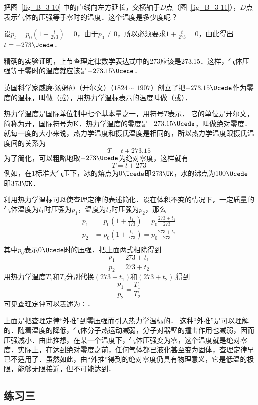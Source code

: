 把图~\ref{fig_B_3-10} 中的直线向左方延长，交横轴于$D$点（图~\ref{fig_B_3-11}），$D$点表示气体的压强等于零时的温度．这个温度是多少度呢？

设$p_t=p_0 \left(1+\frac{t}{273}\right)=0$，由于$p_0\ne 0$，所以必须要求$1+\frac{t}{273}=0$，由此得出$t=-273 \Ucede $．

精确的实验证明，上节查理定律数学表达式中的273应该是273.15．这样，气体压强等于零时的温度就应该是$-273.15 \Ucede $．



英国科学家威廉$\cdot$汤姆孙（开尔文）（$1824 \sim 1907$）创立了把$-273.15 \Ucede$作为零度的温标，叫做（或），用热力学温标表示的温度叫做（或）．

热力学温度是国际单位制中七个基本量之一，用符号$T$表示．
它的单位是开尔文，简称为开，国际符号为K．热力学温度的零度是$-273.15 \Ucede$，叫做绝对零度．就每一度的大小来说，热力学温度和摄氏温度是相同的，所以热力学温度跟摄氏温度间的关系为
\[T=t+273.15 \]
为了简化，可以粗略地取$-273 \Ucede $为绝对零度，这样就有
\[T=t+273 \]
例如，在1标准大气压下，冰的熔点为0$\Ucede$即$273 \UK $，水的沸点为100$\Ucede$即$373 \UK$．

利用热力学温标可以使查理定律的表述简化．设在体积不变的情况下，一定质量的气体温度为$t_1$时压强为$p_1$，温度为$t_2$时压强为$p_2$，那么
\[\begin{split}
p_1&=p_0\left(1+\frac{t_1}{273}\right)=p_0\frac{273+t_1}{273}\\
p_2&=p_0\left(1+\frac{t_2}{273}\right)=p_0\frac{273+t_2}{273}\\
\end{split} \]
其中$p_0$表示0$\Ucede$时的压强．把上面两式相除得到
\[\frac{p_1}{p_2}=\frac{273+t_1}{273+t_2} \]
用热力学温度$T_1$和$T_2$分别代换$(273+t_1)$和$(273+t_2)$,得到
\[\frac{p_1}{p_2}=\frac{T_1}{T_2} \]
可见查理定律可以表述为：．

上面是把查理定律“外推”到零压强而引入热力学温标的．
这种“外推”是可以理解的．随着温度的降低，气体分子热运动减弱，分子对器壁的撞击作用也减弱，因而压强减小．由此推想，在某一个温度下，气体压强变为零，这个温度就是绝对零度．实际上，在达到绝对零度之前，任何气体都已液化甚至变为固体，查理定律早已不适用了．虽然如此，由“外推”得到的绝对零度仍具有物理意义，它是低温的极限，能够无限接近，但不可能达到．

\subsection*{练习三}

